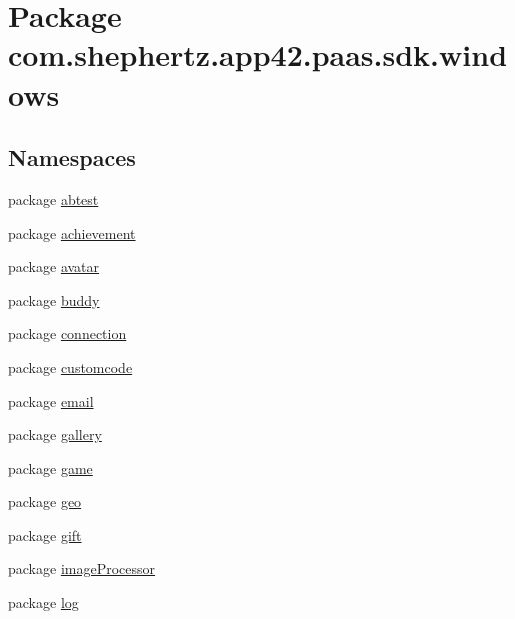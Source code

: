 \hypertarget{namespacecom_1_1shephertz_1_1app42_1_1paas_1_1sdk_1_1windows}{\section{Package com.\+shephertz.\+app42.\+paas.\+sdk.\+windows}
\label{namespacecom_1_1shephertz_1_1app42_1_1paas_1_1sdk_1_1windows}
}
\subsection*{Namespaces}
\begin{DoxyCompactItemize}
\item 
package \hyperlink{namespacecom_1_1shephertz_1_1app42_1_1paas_1_1sdk_1_1windows_1_1abtest}{abtest}
\item 
package \hyperlink{namespacecom_1_1shephertz_1_1app42_1_1paas_1_1sdk_1_1windows_1_1achievement}{achievement}
\item 
package \hyperlink{namespacecom_1_1shephertz_1_1app42_1_1paas_1_1sdk_1_1windows_1_1avatar}{avatar}
\item 
package \hyperlink{namespacecom_1_1shephertz_1_1app42_1_1paas_1_1sdk_1_1windows_1_1buddy}{buddy}
\item 
package \hyperlink{namespacecom_1_1shephertz_1_1app42_1_1paas_1_1sdk_1_1windows_1_1connection}{connection}
\item 
package \hyperlink{namespacecom_1_1shephertz_1_1app42_1_1paas_1_1sdk_1_1windows_1_1customcode}{customcode}
\item 
package \hyperlink{namespacecom_1_1shephertz_1_1app42_1_1paas_1_1sdk_1_1windows_1_1email}{email}
\item 
package \hyperlink{namespacecom_1_1shephertz_1_1app42_1_1paas_1_1sdk_1_1windows_1_1gallery}{gallery}
\item 
package \hyperlink{namespacecom_1_1shephertz_1_1app42_1_1paas_1_1sdk_1_1windows_1_1game}{game}
\item 
package \hyperlink{namespacecom_1_1shephertz_1_1app42_1_1paas_1_1sdk_1_1windows_1_1geo}{geo}
\item 
package \hyperlink{namespacecom_1_1shephertz_1_1app42_1_1paas_1_1sdk_1_1windows_1_1gift}{gift}
\item 
package \hyperlink{namespacecom_1_1shephertz_1_1app42_1_1paas_1_1sdk_1_1windows_1_1image_processor}{image\+Processor}
\item 
package \hyperlink{namespacecom_1_1shephertz_1_1app42_1_1paas_1_1sdk_1_1windows_1_1log}{log}

\end{DoxyCompactItemize}
